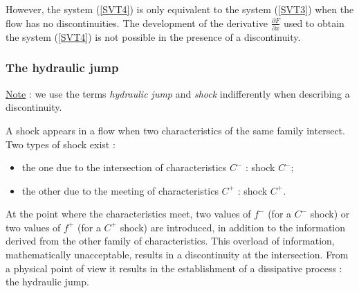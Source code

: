 \vspace{0.5cm}

However, the system (\ref{SVT4}) is only equivalent to the system (\ref{SVT3}) when the flow has no discontinuities. The development of the derivative $\frac{\partial F}{\partial x}$ used to obtain the system (\ref{SVT4}) is not possible in the presence of a discontinuity.

\subsubsection{The hydraulic jump}

\underline{Note} : we use the terms \textit{hydraulic jump} and \textit{shock} indifferently when describing a discontinuity.

\vspace{0.5cm}

A shock appears in a flow when two characteristics of the same family intersect. Two types of shock exist :
\begin{itemize}
 \item the one due to the intersection of characteristics $C^-$ : shock $C^-$;
 \item the other due to the meeting of characteristics $C^+$ : shock $C^+$.
\end{itemize}

\vspace{0.5cm}

At the point where the characteristics meet, two values of $f^-$ (for a $C^-$ shock) or two values of $f^+$ (for a $C^+$ shock) are introduced, in addition to the information derived from the other family of characteristics. This overload of information, mathematically unacceptable, results in a discontinuity at the intersection. From a physical point of view it results in the establishment of a dissipative process : the hydraulic jump.

